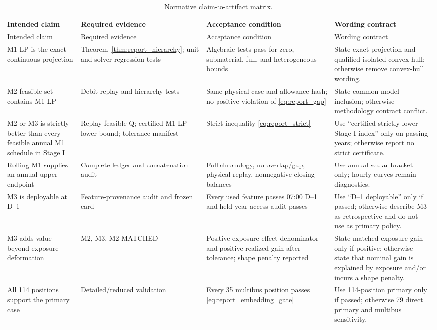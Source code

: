\documentclass[10pt,journal,onecolumn]{IEEEtran}
\begin{document}
\begin{longtable}{@{}p{}p{}p{}p{}@{}}
\caption{Normative claim-to-artifact matrix.}
\label{tab:claim_matrix}\\
\toprule
Intended claim & Required evidence & Acceptance condition & Wording contract \\
\midrule
\endfirsthead
\toprule
Intended claim & Required evidence & Acceptance condition & Wording contract \\
\midrule
\endhead
M1-LP is the exact continuous projection
& Theorem~\ref{thm:report_hierarchy}; unit and solver regression tests
& Algebraic tests pass for zero, submaterial, full, and heterogeneous bounds
& State exact projection and qualified isolated convex hull; otherwise remove convex-hull wording. \\
M2 feasible set contains M1-LP
& Debit replay and hierarchy tests
& Same physical case and allowance hash; no positive violation of \eqref{eq:report_gap}
& State common-model inclusion; otherwise methodology contract conflict. \\
M2 or M3 is strictly better than every feasible annual M1 schedule in Stage I
& Replay-feasible Q; certified M1-LP lower bound; tolerance manifest
& Strict inequality \eqref{eq:report_strict}
& Use ``certified strictly lower Stage-I index'' only on passing years; otherwise report no strict certificate. \\
Rolling M1 supplies an annual upper endpoint
& Complete ledger and concatenation audit
& Full chronology, no overlap/gap, physical replay, nonnegative closing balances
& Use annual scalar bracket only; hourly curves remain diagnostics. \\
M3 is deployable at D--1
& Feature-provenance audit and frozen card
& Every used feature passes 07:00 D--1 and held-year access audit passes
& Use ``D--1 deployable'' only if passed; otherwise describe M3 as retrospective and do not use as primary policy. \\
M3 adds value beyond exposure deformation
& M2, M3, M2-MATCHED
& Positive exposure-effect denominator and positive realized gain after tolerance; shape penalty reported
& State matched-exposure gain only if positive; otherwise state that nominal gain is explained by exposure and/or incurs a shape penalty. \\
All 114 positions support the primary case
& Detailed/reduced validation
& Every 35 multibus position passes \eqref{eq:report_embedding_gate}
& Use 114-position primary only if passed; otherwise 79 direct primary and multibus sensitivity. \\

\end{longtable}
\end{document}
